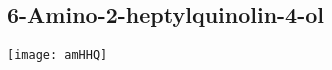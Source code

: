 

\subsection{6-Amino-2-heptylquinolin-4-ol }

\begin{scheme}[H]
	\begin{center}
		\texttt{[image: amHHQ]}
	\end{center}
\end{scheme}

